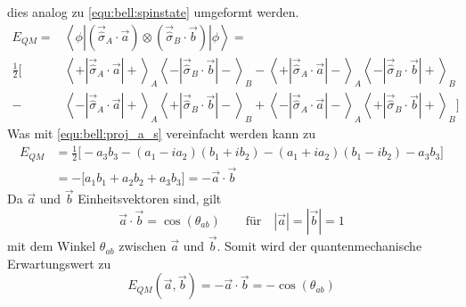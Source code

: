 \begin{refsection}
dies analog zu \eqref{equ:bell:spinstate} umgeformt werden.
\begin{equation} 
\begin{split}
   E_{QM }=&\left\langle \phi \left| 
       \left( \vec{\hat{\sigma}}_A \cdot \vec{a} \right)
               \otimes \left( \vec{\hat{\sigma}}_B \cdot \vec{b} \right)
       \right| \phi \right\rangle
    = \\
    \frac{1}{2}\Bigg[ &
        \left\langle{+}\left| \vec{\hat{\sigma}}_A \cdot \vec{a} \right|{+}\right\rangle_A
        \left\langle{-}\left| \vec{\hat{\sigma}}_B \cdot \vec{b} \right|{-}\right\rangle_B
        -
        \left\langle{+}\left| \vec{\hat{\sigma}}_A \cdot \vec{a} \right|{-}\right\rangle_A
        \left\langle{-}\left| \vec{\hat{\sigma}}_B \cdot \vec{b} \right|{+}\right\rangle_B \\
        - &
        \left\langle{-}\left| \vec{\hat{\sigma}}_A \cdot \vec{a} \right|{+}\right\rangle_A
        \left\langle{+}\left| \vec{\hat{\sigma}}_B \cdot \vec{b} \right|{-}\right\rangle_B
        +
        \left\langle{-}\left| \vec{\hat{\sigma}}_A \cdot \vec{a} \right|{-}\right\rangle_A
        \left\langle{+}\left| \vec{\hat{\sigma}}_B \cdot \vec{b} \right|{+}\right\rangle_B
    \Bigg]
\end{split}
\end{equation}
Was mit \eqref{equ:bell:proj_a_s} vereinfacht werden kann zu
\begin{equation}\label{equ:bell:e_qm}
\begin{split}
    E_{QM} &= \frac{1}{2} \big[ -a_3b_3 - (a_1-ia_2)(b_1+ib_2) - (a_1+ia_2)(b_1-ib_2) - a_3b_3 \big] \\
    &= -\big[ a_1b_1 + a_2b_2 + a_3b_3 \big] = -\vec{a} \cdot \vec{b}
\end{split}
\end{equation}
Da $\vec{a}$ und $\vec{b}$ Einheitsvektoren sind, gilt
\begin{equation}
    \vec{a} \cdot \vec{b} = \cos(\theta_{ab}) \qquad \text{f\"ur} \quad |\vec{a}| = |\vec{b}| = 1
\end{equation}
mit dem Winkel $\theta_{ab}$ zwischen $\vec{a}$ und $\vec{b}$.
Somit wird der quantenmechanische Erwartungswert zu
\begin{equation}\label{equ:bell:res_qm}
    E_{QM}(\vec{a},\vec{b}) = -\vec{a}\cdot\vec{b} = -\cos(\theta_{ab})
\end{equation}


\end{refsection}
